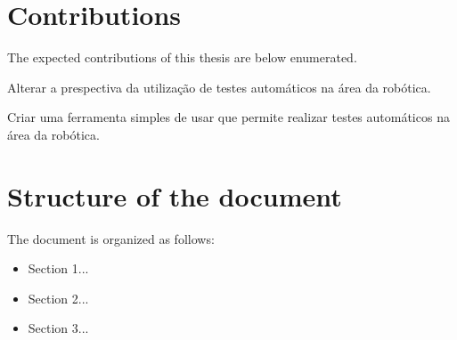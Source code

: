 \section{Contributions}
\label{sec:contributions}

The expected contributions of this thesis are below enumerated.

Alterar a prespectiva da utilização de testes automáticos na área da robótica.

Criar uma ferramenta simples de usar que permite realizar testes automáticos na área da robótica.


\section{Structure of the document}
\label{sec:structure}

The document is organized as follows:

\begin{itemize}
    \item Section 1...
    \item Section 2...
    \item Section 3...
\end{itemize}

